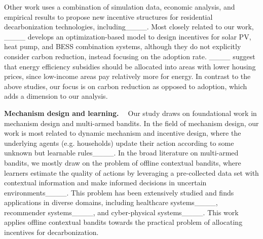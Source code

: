 Other work uses a combination of simulation data, economic analysis, and empirical results to propose new incentive structures for residential decarbonization technologies, including____.  Most closely related to our work, ____ develops an optimization-based model to design incentives for solar PV, heat pump, and BESS combination systems, although they do not explicitly consider carbon reduction, instead focusing on the adoption rate.  ____ suggest that energy efficiency subsidies should be allocated into areas with lower housing prices, since low-income areas pay relatively more for energy. 
In contrast to  the above studies,  our focus is  on carbon reduction as opposed to adoption, which adds a dimension to our analysis.




\noindent\textbf{Mechanism design and learning. \ }
Our study draws on foundational work in mechanism design and multi-armed bandits.  In the field of mechanism design, our work is most related to dynamic mechanism and incentive design, where the underlying agents (e.g. households) update their action according to some unknown but learnable rules____.  
In the broad literature on multi-armed bandits, we mostly draw on the problem of offline contextual bandits, where learners estimate the quality of actions by leveraging a pre-collected data set with contextual information and make informed decisions in uncertain environments____. 
This problem has been extensively studied and finds applications in diverse domains, including healthcare systems____, recommender systems____, and cyber-physical systems____.
This work applies offline contextual bandits towards the practical problem of allocating incentives for decarbonization.

\vspace{-0.15cm}